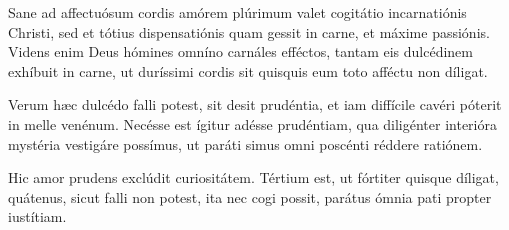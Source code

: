 {\noindent Sane ad affectuósum cordis amórem plúrimum valet cogitátio incarnatiónis Christi, sed et tótius dispensatiónis quam gessit in carne, et máxime passiónis. Videns enim Deus hómines omníno carnáles efféctos, tantam eis dulcédinem exhíbuit in carne, ut duríssimi cordis sit quisquis eum toto afféctu non díligat.

\noindent Verum hæc dulcédo falli potest, sit desit prudéntia, et iam diffícile cavéri póterit in melle venénum. Necésse est ígitur adésse prudéntiam, qua diligénter interióra mystéria vestigáre possímus, ut paráti simus omni poscénti réddere ratiónem.

\noindent Hic amor prudens exclúdit curiositátem. Tértium est, ut fórtiter quisque díligat, quátenus, sicut falli non potest, ita nec cogi possit, parátus ómnia pati propter iustítiam.

\vfill
\pagebreak

 

\vspace{-5mm}


\vfill
\pagebreak
}
\newcommand{\hymnuslaudes}{\pars{Hymnus} \scriptura{Alcuinus (\olddag{} 804)}

\cuminitiali{IV}{temporalia/hym-EcceIam.gtex}}
\newcommand{\benedictus}{\pars{Canticum Zachariæ.} \scriptura{Mt. 22, 26.37; \textbf{H436}}

\vspace{-4mm}

\antiphona{VIII G}{temporalia/ant-magisterquodestmandatummagnum.gtex}

\vspace{-2mm}

\scriptura{Lc. 1, 68-79}


\initiumpsalmi{temporalia/benedictus-initium-viiisoll-G-auto.gtex}




\antiphona{}{temporalia/ant-magisterquodestmandatummagnum.gtex}}


